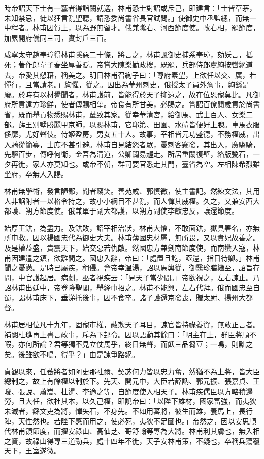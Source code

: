 \begin{pinyinscope}
 時帝詔天下士有一藝者得詣闕就選，林甫恐士對詔或斥己，即建言：「士皆草茅，未知禁忌，徒以狂言亂聖聽，請悉委尚書省長官試問。」使御史中丞監總，而無一中程者。林甫因賀上，以為野無留才。俄兼隴右、河西節度使。改右相，罷節度，加累開府儀同三司，實封戶三百。



 咸寧太守趙奉璋得林甫隱惡二十條，將言之，林甫諷御史捕系奉璋，劾妖言，抵死；著作郎韋子春坐厚善貶。帝嘗大陳樂勤政樓，既罷，兵部侍郎盧絢按轡絕道去，帝愛其愬藉，稱美之。明日林甫召絢子曰：「尊府素望，上欲任以交、廣，若憚行，且當請老。」絢懼，從之。因出為華州刺史，俄授太子員外詹事，絢繇是廢。於時有以材譽聞者，林甫護前，皆能得於天子抑遠之，故在位恩寵莫比。凡御府所貢遠方珍鮮，使者傳賜相望。帝食有所甘美，必賜之。嘗詔百僚閱歲貢於尚書省，既而舉貢物悉賜林甫，輦致其家。從幸華清宮，給御馬、武士百人、女樂二部。薛王別墅勝麗甲京師，以賜林甫，它邸第、田園、水磑皆便好上腴。車馬衣服侈靡，尤好聲伎。侍姬盈房，男女五十人。故事，宰相皆元功盛德，不務權威，出入騎從簡寡，士庶不甚引避。林甫自見結怨者眾，憂刺客竊發，其出入，廣騶騎，先驅百步，傳呼何衛，金吾為清道，公卿闢易趨走。所居重關復壁，絡版甃石，一夕再徙，家人亦莫知也。或帝不朝，群司要官悉走其門，臺省為空。左相陳希烈雖坐府，卒無人入謁。



 林甫無學術，發言陋鄙，聞者竊笑。善苑咸、郭慎微，使主書記。然練文法，其用人非諂附者一以格令持之，故小小綱目不甚亂，而人憚其威權。久之，又兼安西大都護、朔方節度使。俄兼單于副大都護，以朔方副使李獻忠反，讓還節度。



 始厚王鉷，為盡力。及鉷敗，詔宰相治狀，林甫大懼，不敢面鉷，獄具署名，亦無所申救。因以楊國忠代為御史大夫。林甫薄國忠材孱，無所畏，又以貴妃故善之。及是權益盛，貴震天下，始交惡若仇敵。然國忠方兼劍南節度使，而南蠻入寇，林甫因建遣之鎮，欲離間之。國忠入辭，帝曰：「處置且訖，亟還，指日待卿。」林甫聞之憂懣。是時已屬疾，稍侵。會帝幸溫湯，詔以馬輿從，御醫珍膳繼至，詔旨存問，中官護起居。病劇，巫者視疾云：「見天子當少間。」帝欲視之，左右諫止。乃詔林甫出廷中，帝登降聖閣，舉絳巾招之。林甫不能興，左右代拜。俄而國忠至自蜀，謁林甫床下，垂涕托後事，因不食卒。諸子護還京發喪，贈太尉、揚州大都督。



 林甫居相位凡十九年，固寵市權，蔽欺天子耳目，諫官皆持祿養資，無敢正言者。補闕杜璡再上書言政事，斥為下邽令。因以語動其餘曰：「明主在上，群臣將順不暇，亦何所論？君等獨不見立仗馬乎，終日無聲，而飫三品芻豆；一鳴，則黜之矣。後雖欲不鳴，得乎？」由是諫爭路絕。



 貞觀以來，任蕃將者如阿史那社爾、契苾何力皆以忠力奮，然猶不為上將，皆大臣總制之，故上有餘權以制於下。先天、開元中，大臣若薛訥、郭元振、張嘉貞、王晙、張說、蕭嵩、杜暹、李適之等，自節度使入相天子。林甫疾儒臣以方略積邊勞，且大任，欲杜其本，以久己權，即說帝曰：「以陛下雄材，國家富強，而夷狄未滅者，繇文吏為將，憚矢石，不身先。不如用蕃將，彼生而雄，養馬上，長行陣，天性然也。若陛下感而用之，使必死，夷狄不足圖也。」帝然之，因以安思順代林甫領節度，而擢安祿山、高仙芝、哥舒翰等專為大將。林甫利其虜也，無入相之資，故祿山得專三道勁兵，處十四年不徙，天子安林甫策，不疑也，卒稱兵蕩覆天下，王室遂微。




\end{pinyinscope}
